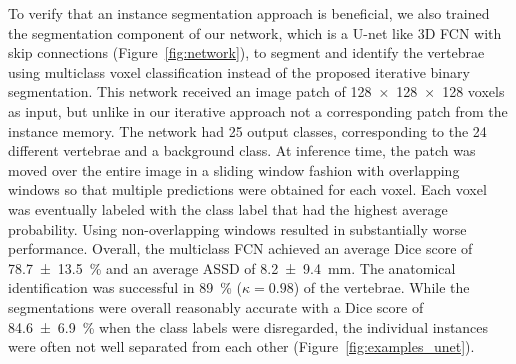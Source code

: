 \documentclass[authoryear,5p,final,times]{elsarticle}
\begin{document}
    To verify that an instance segmentation approach is beneficial, we also trained the segmentation component of our network, which is a U-net like 3D FCN with skip connections (Figure~\ref*{fig:network}), to segment and identify the vertebrae using multiclass voxel classification instead of the proposed iterative binary segmentation. This network received an image patch of \num{128x128x128} voxels as input, but unlike in our iterative approach not a corresponding patch from the instance memory. The network had \num{25} output classes, corresponding to the \num{24} different vertebrae and a background class. At inference time, the patch was moved over the entire image in a sliding window fashion with overlapping windows so that multiple predictions were obtained for each voxel. Each voxel was eventually labeled with the class label that had the highest average probability. Using non-overlapping windows resulted in substantially worse performance. Overall, the multiclass FCN achieved an average Dice score of \SI{78.7(135)}{\percent} and an average ASSD of \SI{8.2(94)}{\milli\meter}. The anatomical identification was successful in \SI{89}{\percent} ($\kappa = 0.98$) of the vertebrae. While the segmentations were overall reasonably accurate with a Dice score of \SI{84.6(69)}{\percent} when the class labels were disregarded, the individual instances were often not well separated from each other (Figure~\ref*{fig:examples_unet}).
	
\end{document}
